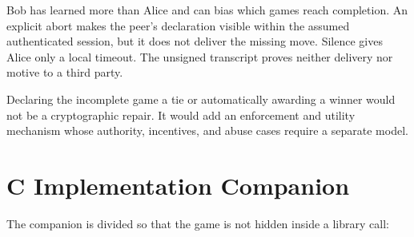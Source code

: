 Bob has learned more than Alice and can bias which games reach completion. An
explicit abort makes the peer's declaration visible within the assumed
authenticated session, but it does not deliver the missing move. Silence gives
Alice only a local timeout. The unsigned transcript proves neither delivery nor
motive to a third party.

Declaring the incomplete game a tie or automatically awarding a winner would
not be a cryptographic repair. It would add an enforcement and utility
mechanism whose authority, incentives, and abuse cases require a separate
model.

\section{C Implementation Companion}

The companion is divided so that the game is not hidden inside a library call:

